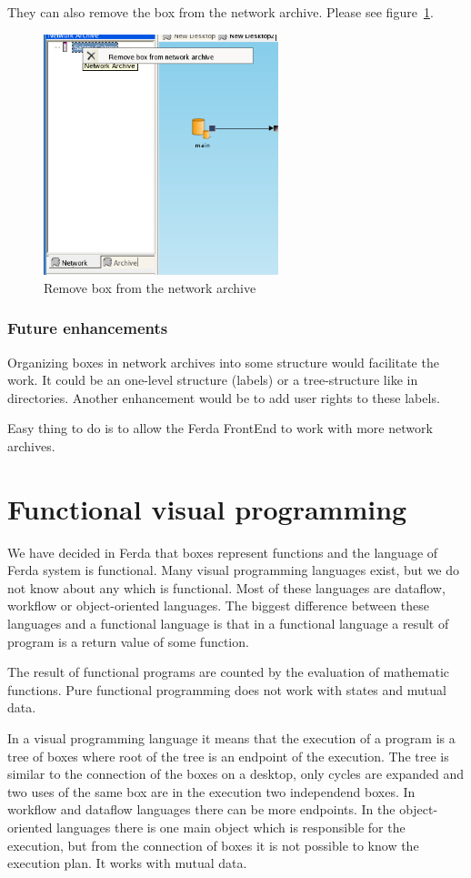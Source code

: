 \documentclass[a4paper,12pt]{book}
\begin{document}
They can also remove the box from the network archive. Please see figure~\ref{fig:removeFromNA}.
\begin{figure}
	\centering
	\includegraphics[height=7cm]{network_archive_remove_box}
	\caption{Remove box from the network archive}
	\label{fig:removeFromNA}
\end{figure}

\subsubsection{Future enhancements}
Organizing boxes in network archives into some structure would facilitate the work. It could be an one-level structure (labels) or a tree-structure like in directories. Another enhancement would be to add user rights to these labels.

Easy thing to do is to allow the Ferda FrontEnd to work with more network archives.

\section{Functional visual programming}
We have decided in Ferda that boxes represent functions and the language of Ferda system is functional. Many visual programming languages exist, but we do not know about any which is functional. Most of these languages are dataflow, workflow or object-oriented languages. The biggest difference between these languages and a functional language is that in a functional language a result of program is a return value of some function.

The result of functional programs are counted by the evaluation of mathematic functions. Pure functional programming does not work with states and mutual data.

In a visual programming language it means that the execution of a program is a tree of boxes where root of the tree is an endpoint of the execution. The tree is similar to the connection of the boxes on a desktop, only cycles are expanded and two uses of the same box are in the execution two independend boxes. In workflow and dataflow languages there can be more endpoints. In the object-oriented languages there is one main object which is responsible for the execution, but from the connection of boxes it is not possible to know the execution plan. It works with mutual data.
\end{document}
